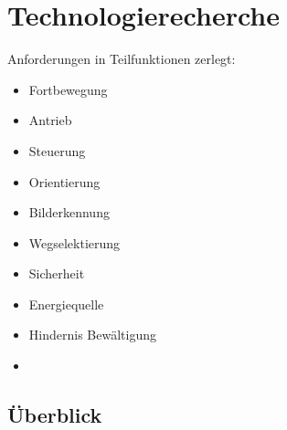 \newpage
\section{Technologierecherche}

Anforderungen in Teilfunktionen zerlegt:
\begin{itemize}
    \item Fortbewegung
    \item Antrieb
    \item Steuerung
    \item Orientierung
    \item Bilderkennung
    \item Wegselektierung
    \item Sicherheit
    \item Energiequelle
    \item Hindernis Bewältigung
    \item 
\end{itemize}

\subsection*{Überblick}

